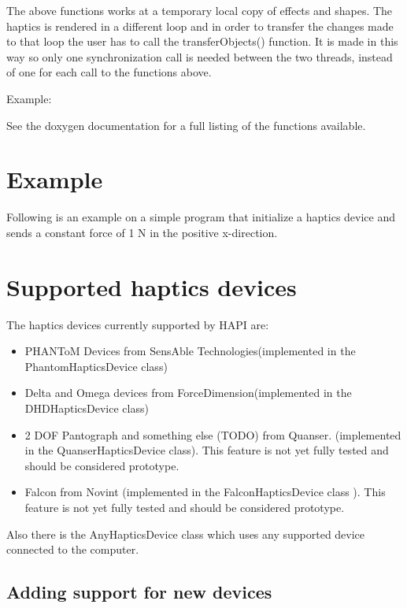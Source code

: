 The above functions works at a temporary local copy of effects and
shapes. The haptics is rendered in a different loop and in order to
transfer the changes made to that loop the user has to call the
transferObjects() function. It is made in this way so only one
synchronization call is needed between the two threads, instead of one
for each call to the functions above.

Example:



See the doxygen documentation for a full listing of the functions
available. 

\section{Example}
Following is an example on a simple program that initialize a haptics
device and sends a constant force of 1 N in the positive x-direction.

 

\section{Supported haptics devices}
The haptics devices currently supported by HAPI are:

\begin{itemize}
\item PHANToM Devices from SensAble Technologies(implemented in the
  PhantomHapticsDevice class)
\item Delta and Omega devices from ForceDimension(implemented in the
  DHDHapticsDevice class)
\item 2 DOF Pantograph and something else (TODO) from Quanser.
 (implemented in the QuanserHapticsDevice class). This feature is not yet fully
 tested and should be considered prototype.
\item Falcon from Novint (implemented in the FalconHapticsDevice class ). 
This feature is not yet fully tested and should be considered prototype.
\end{itemize}

Also there is the AnyHapticsDevice class which uses any supported
device connected to the computer.

\subsection{Adding support for new devices}
\label{ssAddingHapticsSupport}

